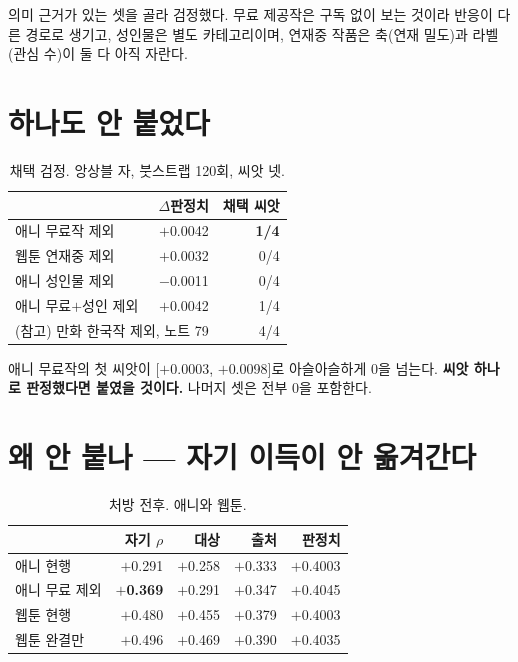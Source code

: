 \documentclass[10pt]{article}
\begin{document}
의미 근거가 있는 셋을 골라 검정했다. 무료 제공작은 구독 없이 보는 것이라
반응이 다른 경로로 생기고, 성인물은 별도 카테고리이며, 연재중 작품은 축(연재
밀도)과 라벨(관심 수)이 둘 다 아직 자란다.

\section{하나도 안 붙었다}

\begin{table}[t]
\centering\tsize
\caption{채택 검정. 앙상블 자, 붓스트랩 120회, 씨앗 넷.}
\begin{tabular}{lrr}
\toprule
& $\Delta$판정치 & 채택 씨앗 \\
\midrule
애니 무료작 제외 & $+$0.0042 & \textbf{1/4} \\
웹툰 연재중 제외 & $+$0.0032 & 0/4 \\
애니 성인물 제외 & $-$0.0011 & 0/4 \\
애니 무료$+$성인 제외 & $+$0.0042 & 1/4 \\
\midrule
\multicolumn{2}{l}{(참고) 만화 한국작 제외, 노트 79} & 4/4 \\
\bottomrule
\end{tabular}
\end{table}

애니 무료작의 첫 씨앗이 $[+$0.0003, $+$0.0098$]$로 아슬아슬하게 0을 넘는다.
\textbf{씨앗 하나로 판정했다면 붙였을 것이다.} 나머지 셋은 전부 0을 포함한다.


\section{왜 안 붙나 --- 자기 이득이 안 옮겨간다}

\begin{table}[t]
\centering\tsize
\caption{처방 전후. 애니와 웹툰.}
\begin{tabular}{lrrrr}
\toprule
& 자기 $\rho$ & 대상 & 출처 & 판정치 \\
\midrule
애니 현행 & $+$0.291 & $+$0.258 & $+$0.333 & $+$0.4003 \\
애니 무료 제외 & \textbf{$+$0.369} & $+$0.291 & $+$0.347 & $+$0.4045 \\
\midrule
웹툰 현행 & $+$0.480 & $+$0.455 & $+$0.379 & $+$0.4003 \\
웹툰 완결만 & $+$0.496 & $+$0.469 & $+$0.390 & $+$0.4035 \\
\bottomrule
\end{tabular}
\end{table}
\end{document}
